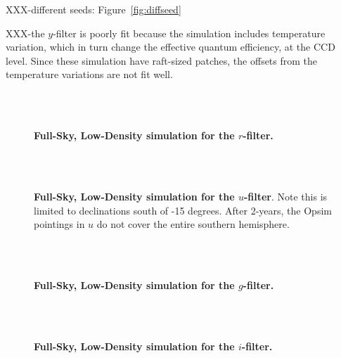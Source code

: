 \documentclass[12pt,preprint]{aastex}
\begin{document}
XXX-different seeds:  Figure~\ref{fig:diffseed}

XXX-the $y$-filter is poorly fit because the simulation includes temperature variation, which in turn change the effective quantum efficiency, at the CCD level.  Since these simulation have raft-sized patches, the offsets from the temperature variations are not fit well.  

\begin{figure}
 \\
 \\
\caption{ {\bf Full-Sky, Low-Density simulation for the $r$-filter.}  \label{fig:r1e6}}
\end{figure}


\begin{figure}
 \\
 \\
\caption{ {\bf Full-Sky, Low-Density simulation for the $u$-filter}.  Note this is limited to declinations south of -15 degrees.  After 2-years, the Opsim pointings in $u$ do not cover the entire southern hemisphere.  \label{fig:u1e6}}
\end{figure}


\begin{figure}
 \\
 \\
\caption{ {\bf Full-Sky, Low-Density simulation for the $g$-filter.}  \label{fig:g1e6}}
\end{figure}
 

\begin{figure}
 \\
 \\
\caption{ {\bf Full-Sky, Low-Density simulation for the $i$-filter.}  \label{fig:i1e6}}
\end{figure}
\end{document}
